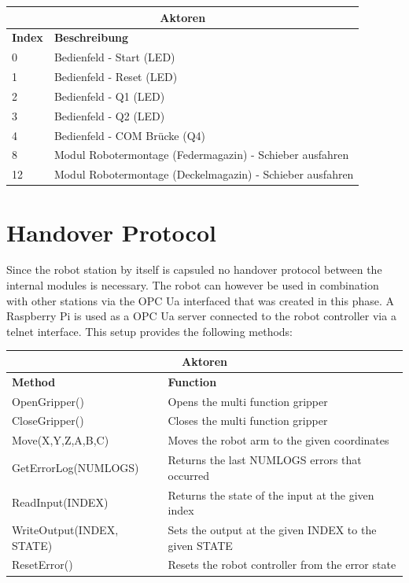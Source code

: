 \documentclass{article}
\begin{document}
\begin{center}
	\setlength\extrarowheight{4pt}
	\small
	\begin{tabularx}{\textwidth}{|p{1cm}|X|}
		\hline

		\multicolumn{2}{|c|}{\bf \color{white} \large Aktoren}\\
		\hline\hline

		\bf Index & \bf Beschreibung\\
		\hline\hline
		0 & Bedienfeld - Start (LED)\\
		\hline
		1 & Bedienfeld - Reset (LED)\\
		\hline
		2 & Bedienfeld - Q1 (LED)\\
		\hline
		3 & Bedienfeld - Q2 (LED)\\
		\hline
		4 & Bedienfeld - COM Brücke (Q4)\\
		\hline
		8 & Modul Robotermontage (Federmagazin) - Schieber ausfahren\\
		\hline
		12 & Modul Robotermontage (Deckelmagazin) - Schieber ausfahren\\
		\hline
	\end{tabularx}
\end{center}
\newpage

\section{Handover Protocol}
Since the robot station by itself is capsuled no handover protocol between the internal modules is necessary. The robot can however be used in combination with other stations via the OPC Ua interfaced that was created in this phase. A Raspberry Pi is used as a OPC Ua server connected to the robot controller via a telnet interface. This setup provides the following methods:

\begin{center}
	\setlength\extrarowheight{4pt}
	\small
	\begin{tabularx}{\textwidth}{|p{5cm}|X|}
		\hline
		
		\multicolumn{2}{|c|}{\bf \color{white} \large Aktoren}\\
		\hline\hline
		
		\bf Method & \bf Function\\
		\hline\hline
		OpenGripper() & Opens the multi function gripper\\
		\hline
		CloseGripper() & Closes the multi function gripper\\
		\hline
		Move(X,Y,Z,A,B,C) & Moves the robot arm to the given coordinates\\
		\hline
		GetErrorLog(NUMLOGS) & Returns the last NUMLOGS errors that occurred\\
		\hline
		ReadInput(INDEX) & Returns the state of the input at the given index\\
		\hline
		WriteOutput(INDEX, STATE) & Sets the output at the given INDEX to the given STATE\\
		\hline
		ResetError() & Resets the robot controller from the error state\\
		\hline
	\end{tabularx}
\end{center}
\end{document}
